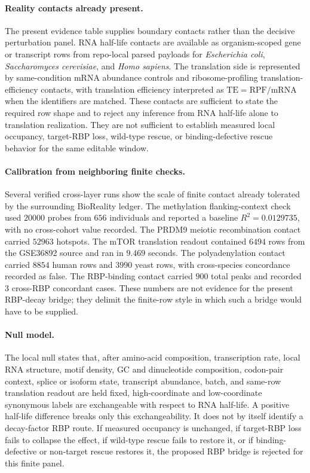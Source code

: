 \paragraph{Reality contacts already present.}
The present evidence table supplies boundary contacts rather than the decisive perturbation panel. RNA half-life contacts are available as organism-scoped gene or transcript rows from repo-local parsed payloads for \textit{Escherichia coli}, \textit{Saccharomyces cerevisiae}, and \textit{Homo sapiens}. The translation side is represented by same-condition mRNA abundance controls and ribosome-profiling translation-efficiency contacts, with translation efficiency interpreted as $\mathrm{TE}=\mathrm{RPF}/\mathrm{mRNA}$ when the identifiers are matched. These contacts are sufficient to state the required row shape and to reject any inference from RNA half-life alone to translation realization. They are not sufficient to establish measured local occupancy, target-RBP loss, wild-type rescue, or binding-defective rescue behavior for the same editable window.

\paragraph{Calibration from neighboring finite checks.}
Several verified cross-layer runs show the scale of finite contact already tolerated by the surrounding BioReality ledger. The methylation flanking-context check used $20000$ probes from $656$ individuals and reported a baseline $R^{2}=0.0129735$, with no cross-cohort value recorded. The PRDM9 meiotic recombination contact carried $52963$ hotspots. The mTOR translation readout contained $6494$ rows from the GSE36892 source and ran in $9.469$ seconds. The polyadenylation contact carried $8854$ human rows and $3990$ yeast rows, with cross-species concordance recorded as false. The RBP-binding contact carried $900$ total peaks and recorded $3$ cross-RBP concordant cases. These numbers are not evidence for the present RBP-decay bridge; they delimit the finite-row style in which such a bridge would have to be supplied.

\paragraph{Null model.}
The local null states that, after amino-acid composition, transcription rate, local RNA structure, motif density, GC and dinucleotide composition, codon-pair context, splice or isoform state, transcript abundance, batch, and same-row translation readout are held fixed, high-coordinate and low-coordinate synonymous labels are exchangeable with respect to RNA half-life. A positive half-life difference breaks only this exchangeability. It does not by itself identify a decay-factor RBP route. If measured occupancy is unchanged, if target-RBP loss fails to collapse the effect, if wild-type rescue fails to restore it, or if binding-defective or non-target rescue restores it, the proposed RBP bridge is rejected for this finite panel.

